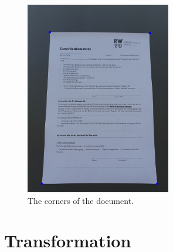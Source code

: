 \documentclass[twocolumn,10pt]{asme2ej}
\begin{document}
\begin{figure}[H]
\centerline{\includegraphics[width=2.5in]{output/hoch_3_5_contouredimage.jpg}}
\caption{The corners of the document.}
\label{fig:contours}
\end{figure}

\cite{doi:10.3138/FM57-6770-U75U-7727}
\cite{RAMER1972244}




\section{Transformation}
\label{section:transformation}


\end{document}
